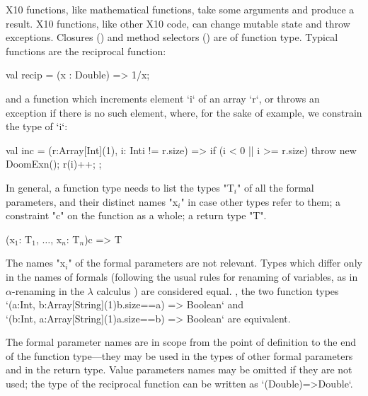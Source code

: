 X10 functions, like mathematical functions, take some arguments and produce a
result.  X10 functions, like other X10 code, can change mutable state and
throw exceptions.  Closures () and method
selectors () are of function type.
Typical functions are the reciprocal function: 
\begin{xten}
val recip = (x : Double) => 1/x;
\end{xten}
and a function which increments  element \xcd`i` of an array \xcd`r`, or throws an exception
if there is no such element, where, for the sake of example, we constrain the
type of \xcd`i`:  
\begin{xten}
val inc = (r:Array[Int](1), i: Int{i != r.size}) => {
  if (i < 0 || i >= r.size) throw new DoomExn();
  r(i)++;
};
\end{xten}

In general, a function type needs to list the types 
\xcdmath"T$_i$"
of all the formal parameters,
and their distinct names \xcdmath"x$_i$" in case other types refer to them; a
constraint 
\xcd"c" on the
function as a whole; a return type \xcd"T".

\begin{xtenmath}
(x$_1$: T$_1$, $\dots$, x$_n$: T$_n$){c} => T
\end{xtenmath}


The names \xcdmath"x$_i$" of the formal parameters are not relevant.  Types
which differ only in the names of formals (following the usual rules for
renaming of variables, as in {$\alpha$}-renaming in the {$\lambda$} calculus
) are considered equal.  \Eg, the two function types
\xcd`(a:Int, b:Array[String](1){b.size==a}) => Boolean`
and \\
\xcd`(b:Int, a:Array[String](1){a.size==b}) => Boolean`
are equivalent.


The formal parameter names are in scope from the point of definition to the
end of the function type---they may be used in the types of other formal parameters
and in the return type. 
Value parameters names may be
omitted if they are not used; the type of the reciprocal function can be
written as
\xcd`(Double)=>Double`. 

